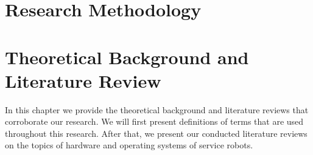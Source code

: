 \documentclass[12pt]{scrreprt}
\begin{document}
\chapter{Research Methodology}


\chapter{Theoretical Background and Literature Review}
In this chapter we provide the theoretical background and literature reviews that corroborate our research. We will first present definitions of terms that are used throughout this research. After that, we present our conducted literature reviews on the topics of hardware and operating systems of service robots.
\label{Theoretical Background}

\end{document}
